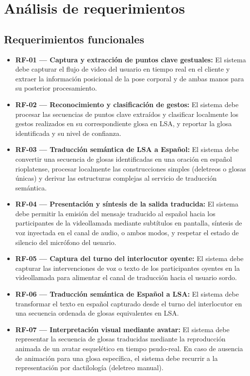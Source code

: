 \chapter{Análisis de requerimientos}

\section{Requerimientos funcionales}
\begin{itemize}
    \item \textbf{RF-01 --- Captura y extracción de puntos clave gestuales:} El sistema debe capturar el flujo de video del usuario en tiempo real en el cliente y extraer la información posicional de la pose corporal y de ambas manos para su posterior procesamiento.
    \item \textbf{RF-02 --- Reconocimiento y clasificación de gestos:} El sistema debe procesar las secuencias de puntos clave extraídos y clasificar localmente los gestos realizados en su correspondiente glosa en LSA, y reportar la glosa identificada y su nivel de confianza.
    \item \textbf{RF-03 --- Traducción semántica de LSA a Español:} El sistema debe convertir una secuencia de glosas identificadas en una oración en español rioplatense, procesar localmente las construcciones simples (deletreos o glosas únicas) y derivar las estructuras complejas al servicio de traducción semántica.
    \item \textbf{RF-04 --- Presentación y síntesis de la salida traducida:} El sistema debe permitir la emisión del mensaje traducido al español hacia los participantes de la videollamada mediante subtítulos en pantalla, síntesis de voz inyectada en el canal de audio, o ambos modos, y respetar el estado de silencio del micrófono del usuario.
    \item \textbf{RF-05 --- Captura del turno del interlocutor oyente:} El sistema debe capturar las intervenciones de voz o texto de los participantes oyentes en la videollamada para alimentar el canal de traducción hacia el usuario sordo.
    \item \textbf{RF-06 --- Traducción semántica de Español a LSA:} El sistema debe transformar el texto en español capturado desde el turno del interlocutor en una secuencia ordenada de glosas equivalentes en LSA.
    \item \textbf{RF-07 --- Interpretación visual mediante avatar:} El sistema debe representar la secuencia de glosas traducidas mediante la reproducción animada de un avatar esquelético en tiempo psudo-real. En caso de ausencia de animación para una glosa específica, el sistema debe recurrir a la representación por dactilología (deletreo manual).

\end{itemize}
